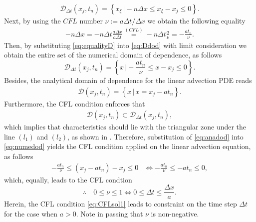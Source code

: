 \documentclass[12pt]{article}
\begin{document}
\begin{enumerate}
	      \begin{align}\label{eq:Ddod}
		      \mathcal{D}_{\Delta t}\left(x_j,t_n\right)
		      =  \left\{ x_{\xi}\, \Big| -n\Delta x \leq x_{\xi} - x_j \leq 0 \right\}.
	      \end{align}
	      Next, by using the $CFL$ number $\nu := a\Delta t/\Delta x$ we obtain the 
	      following equality
	      \begin{align}\label{eq:equalityD}
		      -n\Delta x 
		      = -n\Delta t\frac{a\Delta x}{a \Delta t}
		      \stackrel{(CFL)}{=}
		      -n\Delta t\frac{a}{\nu}
		      = -\frac{at_n}{\nu}.
	      \end{align}
	      Then, by substituting \eqref{eq:equalityD} into \eqref{eq:Ddod}
	      with limit consideration we obtain the entire set of the numerical
	      domain of dependence, as follows 
	      \begin{equation}\label{eq:numedod}
		      \boxed{
			      \mathcal{D}_{\Delta t}\left(x_j,t_n\right)
			      =  \left\{ x \, \Big| -\frac{at_n}{\nu} \leq x - x_j \leq 0 \right\}
		      }.
	      \end{equation}
	      Besides, the analytical domain of dependence for the linear advection PDE reads
	      \begin{align}\label{eq:anadod}
		      \mathcal{D}\left(x_j,t_n\right)
		      =  \left\{ x \, \Big|\, x = x_{j} - at_n \right\} .
	      \end{align}
	      Furthermore, the CFL condition enforces that
	      \begin{align}\label{eq:CFLconditionenforced}
		      \mathcal{D}\left(x_j,t_n\right) \subset \mathcal{D}_{\Delta t}\left(x_j,t_n\right),
	      \end{align}
	      which implies that characteristics should lie with the triangular zone 
	      under the line $(l_1)$ and $(l_2)$, as shown in .
	      Therefore, substitution of \eqref{eq:anadod} into \eqref{eq:numedod} yields
	      the CFL condition applied on the linear advection equation, as follows
	      \begin{align}
		      -\frac{at_n}{\nu} \leq \left(x_{j} - at_n\right) - x_j \leq 0 
		       & \Leftrightarrow
		      -\frac{at_n}{\nu} \leq - at_n \leq 0,
	      \end{align}
	      which, equally, leads to the CFL condtion
	      \begin{equation}\label{eq:CFLsol1}
		      \therefore\quad
		      \boxed{
			      0 \leq \nu \leq 1
			      \Leftrightarrow 
			      0 \leq \Delta t \leq \frac{\Delta x}{a}.
		      }
	      \end{equation}
	      Herein, the CFL condition \eqref{eq:CFLsol1} leads to 
	      constraint on the time step $\Delta t$ for the case when $a > 0$.
	      Note in passing that $\nu$ is non-negative.
	      

\end{enumerate}
\end{document}
